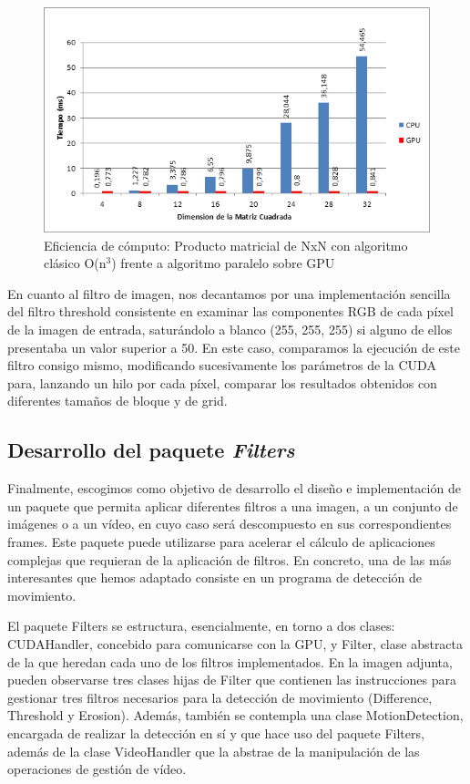 \documentclass[twoside]{article}
\begin{document}
\begin{center}
   \begin{figure}
      \includegraphics[width=.9\textwidth]{cpu-gpu.png}
      \caption{\label{fig:cpu-gpu}Eficiencia de cómputo: Producto matricial de NxN con algoritmo clásico O(n$^{3}$) frente a algoritmo paralelo sobre GPU}
   \end{figure}
\end{center}

En cuanto al filtro de imagen, nos decantamos por una implementación sencilla del filtro threshold consistente en examinar las componentes RGB de cada píxel de la imagen de entrada, saturándolo a blanco (255, 255, 255) si alguno de ellos presentaba un valor superior a 50. En este caso, comparamos la ejecución de este filtro consigo mismo, modificando sucesivamente los parámetros de la CUDA para, lanzando un hilo por cada píxel, comparar los resultados obtenidos con diferentes tamaños de bloque y de grid.

\subsection{Desarrollo del paquete \emph{Filters}}

Finalmente, escogimos como objetivo de desarrollo el diseño e implementación de un paquete que permita aplicar diferentes filtros a una imagen, a un conjunto de imágenes o a un vídeo, en cuyo caso será descompuesto en sus correspondientes frames. Este paquete puede utilizarse para acelerar el cálculo de aplicaciones complejas que requieran de la aplicación de filtros. En concreto, una de las más interesantes que hemos adaptado consiste en un programa de detección de movimiento.

\vspace{5 mm}

El paquete Filters se estructura, esencialmente, en torno a dos clases: CUDAHandler, concebido para comunicarse con la GPU, y Filter, clase abstracta de la que heredan cada uno de los filtros implementados. En la imagen adjunta, pueden observarse tres clases hijas de Filter que contienen las instrucciones para gestionar tres filtros necesarios para la detección de movimiento (Difference, Threshold y Erosion). Además, también se contempla una clase MotionDetection, encargada de realizar la detección en sí y que hace uso del paquete Filters, además de la clase VideoHandler que la abstrae de la manipulación de las operaciones de gestión de vídeo.
\end{document}
